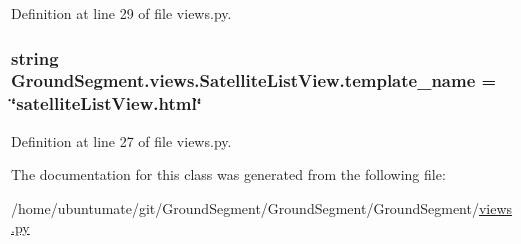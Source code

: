 Definition at line 29 of file views.\+py.

\hypertarget{class_ground_segment_1_1views_1_1_satellite_list_view_a35e83703976f9b723aebb9b899924d9a}{}
\subsubsection[{template\+\_\+name}]{\setlength{\rightskip}{0pt plus 5cm}string Ground\+Segment.\+views.\+Satellite\+List\+View.\+template\+\_\+name = \char`\"{}satellite\+List\+View.\+html\char`\"{}\hspace{0.3cm}{\ttfamily [static]}}\label{class_ground_segment_1_1views_1_1_satellite_list_view_a35e83703976f9b723aebb9b899924d9a}


Definition at line 27 of file views.\+py.



The documentation for this class was generated from the following file\+:\begin{DoxyCompactItemize}
\item 
/home/ubuntumate/git/\+Ground\+Segment/\+Ground\+Segment/\+Ground\+Segment/\hyperlink{views_8py}{views.\+py}\end{DoxyCompactItemize}
